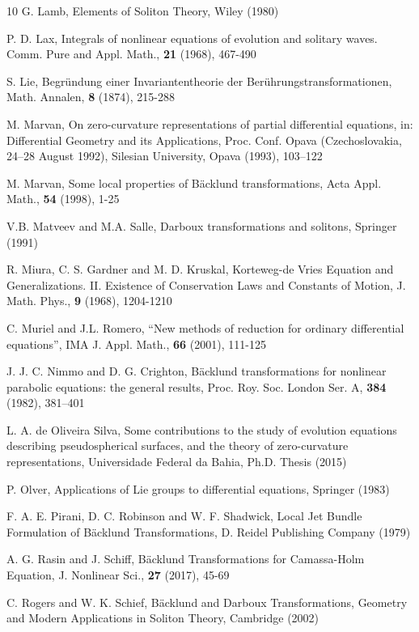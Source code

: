 \documentclass[12pt,english]{elsarticle}
\theoremstyle{plain}
\theoremstyle{plain}
\theoremstyle{remark}
\theoremstyle{plain}
\theoremstyle{definition}
\theoremstyle{definition}
\begin{document}
\begin{thebibliography}{10}
G. Lamb, Elements of Soliton Theory, Wiley (1980)

P. D. Lax, Integrals of nonlinear equations of evolution
and solitary waves. Comm. Pure and Appl. Math., \textbf{21} (1968),
467-490 

S. Lie, Begründung einer Invariantentheorie der Berührungstransformationen,
Math. Annalen, \textbf{8} (1874), 215-288

M. Marvan, On zero-curvature representations of
partial differential equations, in: Differential Geometry and its
Applications, Proc. Conf. Opava (Czechoslovakia, 24--28 August 1992),
Silesian University, Opava (1993), 103--122

M. Marvan, Some local properties of Bäcklund transformations,
Acta Appl. Math., \textbf{54} (1998), 1-25

V.B. Matveev and M.A. Salle, Darboux transformations
and solitons, Springer (1991)

R. Miura, C. S. Gardner and M. D.
Kruskal, Korteweg-de Vries Equation and Generalizations. II. Existence
of Conservation Laws and Constants of Motion, J. Math. Phys., \textbf{9}
(1968), 1204-1210

C. Muriel and J.L. Romero, “New methods of
reduction for ordinary differential equations”, IMA J. Appl. Math.,
\textbf{66} (2001), 111-125

 J. J. C. Nimmo and D. G. Crighton, Bäcklund transformations
for nonlinear parabolic equations: the general results, Proc. Roy.
Soc. London Ser. A, \textbf{384} (1982), 381--401

L. A. de Oliveira Silva, Some contributions to
the study of evolution equations describing pseudospherical surfaces,
and the theory of zero-curvature representations, Universidade Federal
da Bahia, Ph.D. Thesis (2015) 

P. Olver, Applications of Lie groups to differential
equations, Springer (1983)

F. A. E. Pirani, D. C. Robinson and W. F. Shadwick,
Local Jet Bundle Formulation of Bäcklund Transformations, D. Reidel
Publishing Company (1979)

A. G. Rasin and J. Schiff, Bäcklund Transformations
for Camassa-Holm Equation, J. Nonlinear Sci., \textbf{27} (2017),
45-69

C. Rogers and W. K. Schief, Bäcklund and Darboux
Transformations, Geometry and Modern Applications in Soliton Theory,
Cambridge (2002)


\end{thebibliography}
\end{document}
